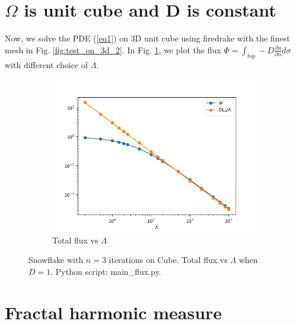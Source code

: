 \documentclass[12pt]{article}%
\theoremstyle{plain}
\numberwithin{equation}{section}
\begin{document}
\section{$\Omega$ is unit cube and D is constant}
Now, we solve the PDE (\ref{eq1}) on 3D unit cube using firedrake with the finest mesh in Fig. \ref{fig:test_on_3d_2}. In Fig. \ref{flux_cube}, we plot the flux $\Phi=\int_{top}-D\frac{\partial u}{\partial n}d\sigma$ with different choice of $\Lambda$.
  \begin{figure}[H]%
    \centering
 \begin{subfigure}[h]{0.45\linewidth}
         \caption{Total flux vs $\Lambda$}
\includegraphics[width=\linewidth]{figures/Ex2/Phi_Lam_cube.png}
\end{subfigure}
  \caption{Snowflake with $n=3$ iterations on Cube. Total flux vs $\Lambda$ when $D=1$. Python script: main\_flux.py.}
  \label{flux_cube}
 \end{figure}



\section{Fractal harmonic measure}
\end{document}
